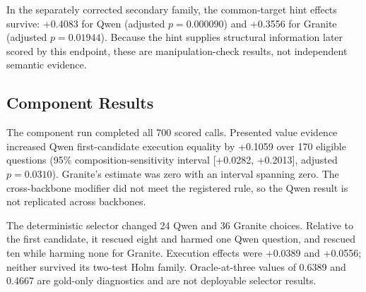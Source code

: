 \documentclass[applsci,article,submit,moreauthors]{Definitions/mdpi}
\begin{document}
In the separately corrected secondary family, the common-target hint effects survive: +0.4083 for Qwen (adjusted $p=0.000090$) and +0.3556 for Granite (adjusted $p=0.01944$). Because the hint supplies structural information later scored by this endpoint, these are manipulation-check results, not independent semantic evidence.

\subsection{Component Results}

The component run completed all 700 scored calls. Presented value evidence increased Qwen first-candidate execution equality by +0.1059 over 170 eligible questions (95\% composition-sensitivity interval [+0.0282, +0.2013], adjusted $p=0.0310$). Granite's estimate was zero with an interval spanning zero. The cross-backbone modifier did not meet the registered rule, so the Qwen result is not replicated across backbones.

The deterministic selector changed 24 Qwen and 36 Granite choices. Relative to the first candidate, it rescued eight and harmed one Qwen question, and rescued ten while harming none for Granite. Execution effects were +0.0389 and +0.0556; neither survived its two-test Holm family. Oracle-at-three values of 0.6389 and 0.4667 are gold-only diagnostics and are not deployable selector results.

\begin{table}[htbp]
\caption{Complete component endpoints from the 700-call audited prospective component protocol. V0 contains the 170 value-intervention-eligible questions; V1 contains all 180. These are component, not five-role, outcomes.}
\label{tab:componentcounts}
\centering
\small
{}
\end{table}
\end{document}
